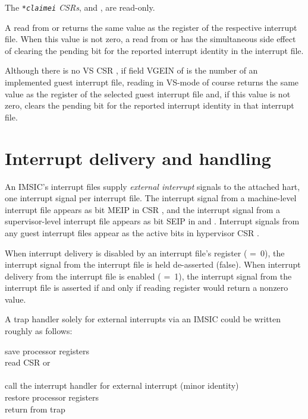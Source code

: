 The \emph{\texttt{*claimei} CSRs},  and , are
read-only.

A read from  or  returns the same value as the
 register of the respective interrupt file.
When this value is not zero, a read from  or 
has the simultaneous side effect of clearing the pending bit for the
reported interrupt identity in the interrupt file.

Although there is no VS CSR , if field VGEIN of
 is the number of an implemented guest interrupt file,
reading  in \mbox{VS-mode} of course returns the same value
as the  register of the selected guest interrupt file and,
if this value is not zero, clears the pending bit for the reported
interrupt identity in that interrupt file.

\section{Interrupt delivery and handling}

An IMSIC's interrupt files supply \emph{external interrupt} signals to
the attached hart, one interrupt signal per interrupt file.
The interrupt signal from a machine-level interrupt file appears as bit
MEIP in CSR , and the interrupt signal from a supervisor-level
interrupt file appears as bit SEIP in  and .
Interrupt signals from any guest interrupt files appear as the active
bits in hypervisor CSR .

When interrupt delivery is disabled by an interrupt file's
 register ( =~0), the interrupt signal from
the interrupt file is held de-asserted (false).
When interrupt delivery from the interrupt file is enabled
( =~1), the interrupt signal from the interrupt file
is asserted if and only if reading register  would return a
nonzero value.

A trap handler solely for external interrupts via an IMSIC could be
written roughly as follows:
\begin{displayLinesTable}
save processor registers \\
read CSR  or  \\
 \\
call the interrupt handler for external interrupt  (minor identity) \\
restore processor registers \\
return from trap \\
\end{displayLinesTable}

